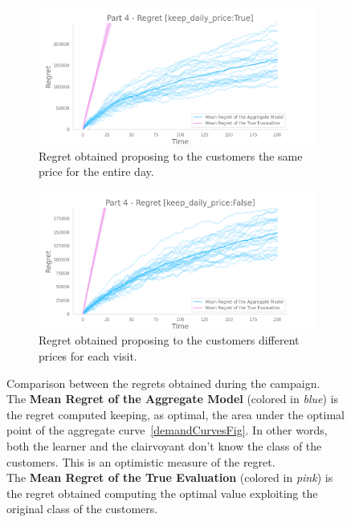 \begin{figure}[!htb]
    \centering

    \begin{subfigure}[!H]{0.8\textwidth}
        \centering
        \includegraphics[width=\textwidth]{images/part4_keep-daily-priceTrue.png}
        \caption{Regret obtained proposing to the customers the same price for the entire day.}
    \end{subfigure}
    \begin{subfigure}[!H]{0.8\textwidth}
        \centering
        \includegraphics[width=\textwidth]{images/part4_keep-daily-priceFalse.png}
        \caption{Regret obtained proposing to the customers different prices for each visit.}
    \end{subfigure}

    \caption{Comparison between the regrets obtained during the campaign.\\
    The \textbf{Mean Regret of the Aggregate Model} (colored in \textit{blue}) is the regret computed keeping, as optimal, the area under the optimal point of the aggregate curve~\ref{demandCurvesFig}. In other words, both the learner and the clairvoyant don't know the class of the customers. This is an optimistic measure of the regret.\\
    The \textbf{Mean Regret of the True Evaluation} (colored in \textit{pink}) is the regret obtained computing the optimal value exploiting the original class of the customers.}
    \label{regret4Fig}
\end{figure}